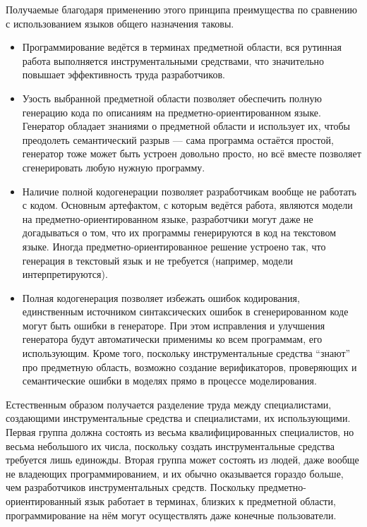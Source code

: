 Получаемые благодаря применению этого принципа преимущества по сравнению с 
использованием языков общего назначения таковы.
\begin{itemize}
	\item Программирование ведётся в терминах предметной области, вся рутинная 
		работа выполняется инструментальными средствами, что значительно повышает 
		эффективность труда разработчиков.
	\item Узость выбранной предметной области позволяет обеспечить полную 
		генерацию кода по описаниям на предметно-ориентированном языке. Генератор 
		обладает знаниями о предметной области и использует их, чтобы преодолеть 
		семантический разрыв --- сама программа остаётся простой, генератор тоже 
		может быть устроен довольно просто, но всё вместе позволяет сгенерировать 
		любую нужную программу.
	\item Наличие полной кодогенерации позволяет разработчикам вообще не работать 
		с кодом. Основным артефактом, с которым ведётся работа, являются модели на 
		предметно-ориентированном языке, разработчики могут даже не догадываться о 
		том, что их программы генерируются в код на текстовом языке. Иногда 
		предметно-ориентированное решение устроено так, что генерация в текстовый 
		язык и не требуется (например, модели интерпретируются).
	\item Полная кодогенерация позволяет избежать ошибок кодирования, единственным 
		источником синтаксических ошибок в сгенерированном коде могут быть ошибки в 
		генераторе. При этом исправления и улучшения генератора будут автоматически 
		применимы ко всем программам, его использующим. Кроме того, поскольку 
		инструментальные средства "`знают"' про предметную область, возможно 
		создание верификаторов, проверяющих и семантические ошибки в моделях прямо 
		в процессе моделирования.
\end{itemize}

Естественным образом получается разделение труда между специалистами, 
создающими инструментальные средства и специалистами, их использующими. 
Первая группа должна состоять из весьма квалифицированных специалистов, но 
весьма небольшого их числа, поскольку создать инструментальные средства 
требуется лишь единожды. Вторая группа может состоять из людей, даже вообще не 
владеющих программированием, и их обычно оказывается гораздо больше, чем 
разработчиков инструментальных средств. Поскольку предметно-ориентированный язык 
работает в терминах, близких к предметной области, программирование на нём могут 
осуществлять даже конечные пользователи.

